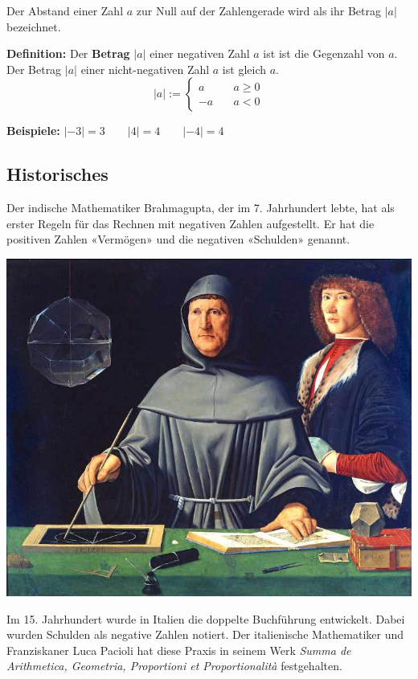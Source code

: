 Der Abstand einer Zahl $a$ zur Null auf der Zahlengerade wird als ihr Betrag $|a|$ bezeichnet.

\textbf{Definition:} Der \textbf{Betrag} $|a|$ einer negativen Zahl $a$ ist ist die Gegenzahl von $a$. Der Betrag $|a|$ einer nicht-negativen Zahl $a$ ist gleich $a$.
\[
  |a| := \begin{cases}
    a &\quad a \geq 0 \\
    -a &\quad a < 0
  \end{cases}
\]

\begin{example}
  \textbf{Beispiele:} $|-3| = 3 \qquad |4| = 4 \qquad |-4| = 4$
\end{example}

\subsection{Historisches}

Der indische Mathematiker Brahmagupta, der im 7. Jahrhundert lebte, hat als erster Regeln für das Rechnen mit negativen Zahlen aufgestellt. Er hat die positiven Zahlen «Vermögen» und die negativen «Schulden» genannt.

\begin{minipage}[t]{0.45\textwidth}
  \vspace{0cm}
  \includegraphics[width=.9\textwidth]{Pacioli.jpg}
\end{minipage}
\begin{minipage}[t]{0.55\textwidth}
  \vspace{0cm}
  Im 15. Jahrhundert wurde in Italien die doppelte Buchführung entwickelt. Dabei wurden Schulden als negative Zahlen notiert. Der italienische Mathematiker und Franziskaner Luca Pacioli hat diese Praxis in seinem Werk \textit{Summa de Arithmetica, Geometria, Proportioni et Proportionalità} festgehalten.
\end{minipage}

